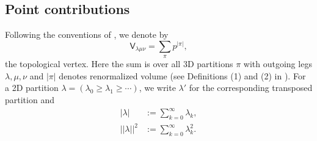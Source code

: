 \documentclass{amsart}
\theoremstyle{definition}
\newcommand{\sfV}{\mathsf{V}}
\begin{document}
\subsection{Point contributions}   

Following the conventions of \cite{Bryan-Kool-Young}, we denote by 
$$
\sfV_{\lambda\mu\nu} = \sum_{\pi} p^{|\pi|}, 
$$
the topological vertex. Here the sum is over all 3D partitions $\pi$
with outgoing legs $\lambda, \mu, \nu$ and $|\pi|$ denotes
renormalized volume (see Definitions (1) and (2) in \cite{Bryan-Kool-Young}). For a
2D partition $\lambda = (\lambda_0 \geq \lambda_1 \geq \cdots)$, we
write $\lambda'$ for the corresponding transposed partition and
\begin{align*}
|\lambda| &:= \sum_{k=0}^{\infty} \lambda_k, \\
|\!|\lambda|\!|^2 &:= \sum_{k=0}^{\infty} \lambda_{k}^{2}.
\end{align*}
\end{document}
